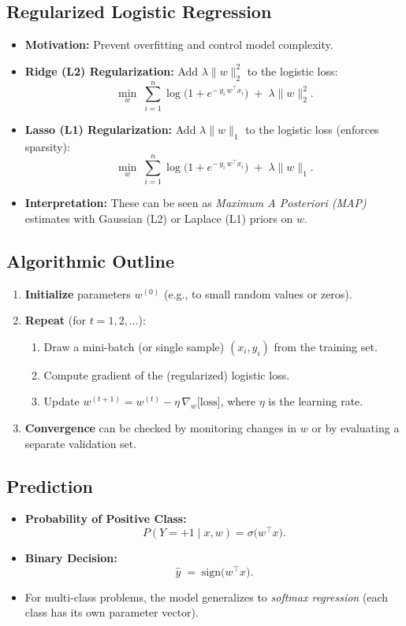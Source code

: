 \documentclass[twocolumn]{article}
\begin{document}
\begin{spacing}{1}
\subsection{Regularized Logistic Regression}
\begin{itemize}
    \item \textbf{Motivation:} Prevent overfitting and control model complexity.
    \item \textbf{Ridge (L2) Regularization:} Add $\lambda \|w\|_2^2$ to the logistic loss:
    \[
        \min_{w} \;\sum_{i=1}^n \log\bigl(1 + e^{-\,y_i\,w^\top x_i}\bigr) \;+\; \lambda \|w\|_2^2.
    \]
    \item \textbf{Lasso (L1) Regularization:} Add $\lambda \|w\|_1$ to the logistic loss (enforces sparsity):
    \[
        \min_{w} \;\sum_{i=1}^n \log\bigl(1 + e^{-\,y_i\,w^\top x_i}\bigr) \;+\; \lambda \|w\|_1.
    \]
    \item \textbf{Interpretation:} These can be seen as \emph{Maximum A Posteriori (MAP)} estimates with Gaussian (L2) or Laplace (L1) priors on $w$.
\end{itemize}

\subsection{Algorithmic Outline}
\begin{enumerate}
    \item \textbf{Initialize} parameters $w^{(0)}$ (e.g., to small random values or zeros).
    \item \textbf{Repeat} (for $t = 1, 2, \ldots$):
    \begin{enumerate}
        \item Draw a mini-batch (or single sample) $(x_i, y_i)$ from the training set.
        \item Compute gradient of the (regularized) logistic loss.
        \item Update $w^{(t+1)} = w^{(t)} - \eta \,\nabla_{w} \bigl[\text{loss}\bigr]$,
        where $\eta$ is the learning rate.
    \end{enumerate}
    \item \textbf{Convergence} can be checked by monitoring changes in $w$ or by evaluating a separate validation set.
\end{enumerate}

\subsection{Prediction}
\begin{itemize}
    \item \textbf{Probability of Positive Class:} 
    \[
        P(Y=+1 \mid x, w) = \sigma\bigl(w^\top x\bigr).
    \]
    \item \textbf{Binary Decision:} 
    \[
        \hat{y} \;=\; \mathrm{sign}\bigl(w^\top x\bigr).
    \]
    \item For multi-class problems, the model generalizes to \emph{softmax regression} (each class has its own parameter vector).
\end{itemize}


\end{spacing}
\end{document}
